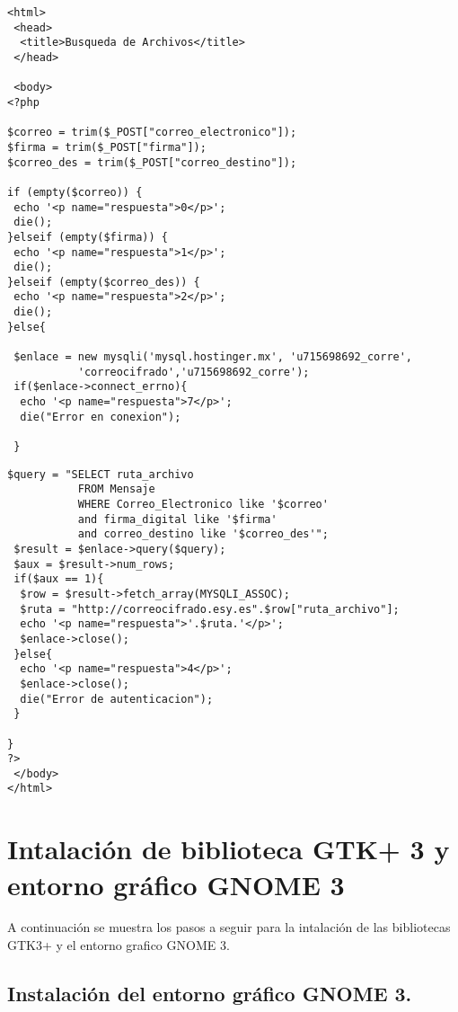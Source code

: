  \begin{lstlisting}[frame=single]
 <html>
 <head>
  <title>Busqueda de Archivos</title> 
 </head>

 <body>
<?php

$correo = trim($_POST["correo_electronico"]);
$firma = trim($_POST["firma"]);
$correo_des = trim($_POST["correo_destino"]);

if (empty($correo)) {
 echo '<p name="respuesta">0</p>';
 die();
}elseif (empty($firma)) {
 echo '<p name="respuesta">1</p>';
 die();
}elseif (empty($correo_des)) {
 echo '<p name="respuesta">2</p>';
 die();
}else{

 $enlace = new mysqli('mysql.hostinger.mx', 'u715698692_corre',
           'correocifrado','u715698692_corre');
 if($enlace->connect_errno){
  echo '<p name="respuesta">7</p>';
  die("Error en conexion");

 }
\end{lstlisting}
\begin{lstlisting}[frame=single]
 $query = "SELECT ruta_archivo 
           FROM Mensaje 
           WHERE Correo_Electronico like '$correo' 
           and firma_digital like '$firma' 
           and correo_destino like '$correo_des'";
 $result = $enlace->query($query);
 $aux = $result->num_rows;
 if($aux == 1){
  $row = $result->fetch_array(MYSQLI_ASSOC);
  $ruta = "http://correocifrado.esy.es".$row["ruta_archivo"];
  echo '<p name="respuesta">'.$ruta.'</p>';
  $enlace->close();
 }else{
  echo '<p name="respuesta">4</p>';
  $enlace->close();
  die("Error de autenticacion");
 }

}
?>
 </body>
</html>
 \end{lstlisting}

\chapter{Intalación de biblioteca GTK+ 3 y entorno gráfico GNOME 3}
\label{Anexos D}

A continuación se muestra los pasos a seguir para la intalación de las bibliotecas GTK3+ y el entorno grafico GNOME 3.

\section{Instalación del entorno gráfico GNOME 3.}


